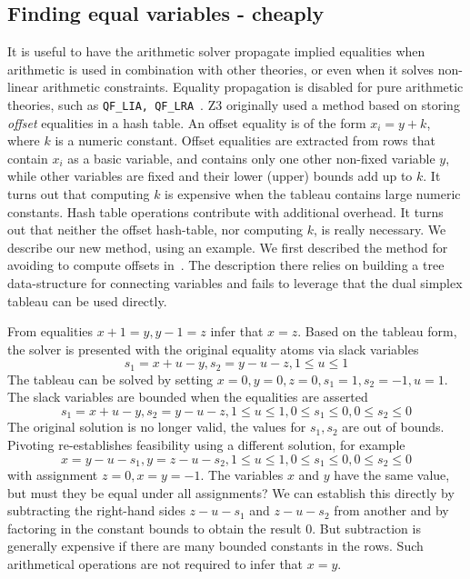\subsection{Finding equal variables - cheaply}
It is useful to have the arithmetic solver propagate implied equalities when arithmetic is used in combination with other theories, or even when
it solves non-linear arithmetic constraints. Equality propagation is disabled for pure arithmetic theories, such as {\tt QF\_LIA, QF\_LRA}~\cite{SMTLIB2}.
Z3 originally used a method based on storing \emph{offset} equalities in a hash table.
An offset equality is of the form $x_i = y + k$, where $k$ is a numeric constant.
Offset equalities are extracted from rows that contain $x_i$ as a basic variable, and contains
only one other non-fixed variable $y$, while other variables are fixed and their lower
(upper) bounds add up to $k$. It turns out that computing $k$ is
expensive when the tableau contains large numeric constants. Hash table operations
contribute with additional overhead. It turns out that neither the offset hash-table, nor computing $k$,
is really necessary. We describe our new method, using an example.
We first described the method for avoiding to compute offsets in~\cite{DBLP:conf/sbmf/BjornerN20}.
The description there relies on building a tree data-structure for connecting variables and fails to leverage that the dual simplex tableau can be
used directly.


\begin{example}

From equalities $x + 1 = y, y - 1 = z$ infer that $x = z$. Based on the tableau form, the solver is presented with the original equality atoms via slack variables
\[
    s_1 = x + u - y, s_2 = y - u - z, 1 \leq u \leq 1
    \]	
The tableau can be solved by setting $x = 0, y = 0, z = 0, s_1 = 1, s_2 = -1, u = 1$.
The slack variables are bounded when the equalities are asserted
\[
    s_1 = x + u - y, s_2 = y - u - z, 1 \leq u \leq 1, 0 \leq s_1 \leq 0, 0 \leq s_2 \leq 0
    \]
The original solution is no longer valid, the values for $s_1, s_2$ are out of bounds.
Pivoting re-establishes feasibility using a different solution, for example
\[
    x = y - u - s_1, y = z - u - s_2, 1 \leq u \leq 1, 0 \leq s_1 \leq 0, 0 \leq s_2 \leq 0
    \]
with assignment $z = 0, x = y = -1$. The variables $x$ and $y$ have the same value,
but must they be equal under all assignments? We can establish this directly by subtracting the
right-hand sides $z - u - s_1$ and $z - u - s_2$ from another and by factoring in the constant bounds to obtain
the result $0$. But subtraction is generally expensive if there are many bounded constants in the rows.
Such arithmetical operations are not required to infer that $x = y$.

\end{example}

